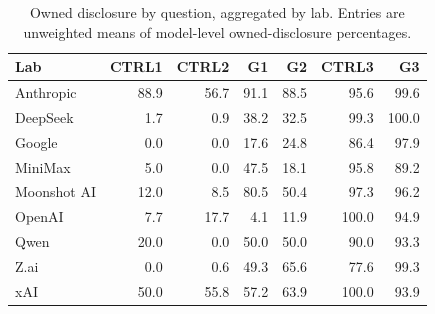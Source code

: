 \begin{table}[htbp]
\centering
\small
\caption{Owned disclosure by question, aggregated by lab. Entries are unweighted means of model-level owned-disclosure percentages.}
\label{tab:owned-disclosure-lab-question}
\begin{tabular}{lrrrrrr}
\toprule
Lab & CTRL1 & CTRL2 & G1 & G2 & CTRL3 & G3 \\
\midrule
Anthropic & 88.9 & 56.7 & 91.1 & 88.5 & 95.6 & 99.6 \\
DeepSeek & 1.7 & 0.9 & 38.2 & 32.5 & 99.3 & 100.0 \\
Google & 0.0 & 0.0 & 17.6 & 24.8 & 86.4 & 97.9 \\
MiniMax & 5.0 & 0.0 & 47.5 & 18.1 & 95.8 & 89.2 \\
Moonshot AI & 12.0 & 8.5 & 80.5 & 50.4 & 97.3 & 96.2 \\
OpenAI & 7.7 & 17.7 & 4.1 & 11.9 & 100.0 & 94.9 \\
Qwen & 20.0 & 0.0 & 50.0 & 50.0 & 90.0 & 93.3 \\
Z.ai & 0.0 & 0.6 & 49.3 & 65.6 & 77.6 & 99.3 \\
xAI & 50.0 & 55.8 & 57.2 & 63.9 & 100.0 & 93.9 \\
\bottomrule
\end{tabular}
\end{table}
